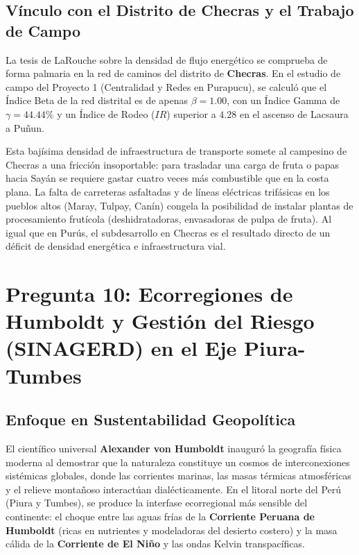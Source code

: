 \documentclass[11pt,a4paper]{article}
\begin{document}
\subsection{Vínculo con el Distrito de Checras y el Trabajo de Campo}
La tesis de LaRouche sobre la densidad de flujo energético se comprueba de forma palmaria en la red de caminos del distrito de \textbf{Checras}. En el estudio de campo del Proyecto 1 (Centralidad y Redes en Purapucu), se calculó que el Índice Beta de la red distrital es de apenas $\beta = 1.00$, con un Índice Gamma de $\gamma = 44.44\%$ y un Índice de Rodeo ($IR$) superior a $4.28$ en el ascenso de Lacsaura a Puñun.

Esta bajísima densidad de infraestructura de transporte somete al campesino de Checras a una fricción insoportable: para trasladar una carga de fruta o papas hacia Sayán se requiere gastar cuatro veces más combustible que en la costa plana. La falta de carreteras asfaltadas y de líneas eléctricas trifásicas en los pueblos altos (Maray, Tulpay, Canín) congela la posibilidad de instalar plantas de procesamiento frutícola (deshidratadoras, envasadoras de pulpa de fruta). Al igual que en Purús, el subdesarrollo en Checras es el resultado directo de un déficit de densidad energética e infraestructura vial.


\newpage

\section{Pregunta 10: Ecorregiones de Humboldt y Gestión del Riesgo (SINAGERD) en el Eje Piura-Tumbes}

\subsection{Enfoque en Sustentabilidad Geopolítica}
El científico universal \textbf{Alexander von Humboldt} inauguró la geografía física moderna al demostrar que la naturaleza constituye un cosmos de interconexiones sistémicas globales, donde las corrientes marinas, las masas térmicas atmosféricas y el relieve montañoso interactúan dialécticamente. En el litoral norte del Perú (Piura y Tumbes), se produce la interfase ecorregional más sensible del continente: el choque entre las aguas frías de la \textbf{Corriente Peruana de Humboldt} (ricas en nutrientes y modeladoras del desierto costero) y la masa cálida de la \textbf{Corriente de El Niño} y las ondas Kelvin transpacíficas.
\end{document}
